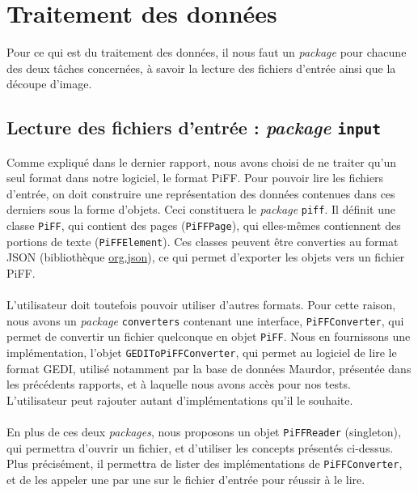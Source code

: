 \section{Traitement des données}

Pour ce qui est du traitement des données, il nous faut un \textit{package} pour chacune des deux tâches concernées, à savoir la lecture des fichiers d'entrée ainsi que la découpe d'image.

\subsection{Lecture des fichiers d'entrée : \textit{package} \texttt{input}}

Comme expliqué dans le dernier rapport, nous avons choisi de ne traiter qu'un seul format dans notre logiciel, le format PiFF. Pour pouvoir lire les fichiers d'entrée, on doit construire une représentation des données contenues dans ces derniers sous la forme d'objets. Ceci constituera le \textit{package} \texttt{piff}. Il définit une classe \texttt{PiFF}, qui contient des pages (\texttt{PiFFPage}), qui elles-mêmes contiennent des portions de texte (\texttt{PiFFElement}). Ces classes peuvent être converties au format JSON (bibliothèque \href{https://mvnrepository.com/artifact/org.json/json}{org.json}), ce qui permet d'exporter les objets vers un fichier PiFF.

\paragraph{}
L'utilisateur doit toutefois pouvoir utiliser d'autres formats. Pour cette raison, nous avons un \textit{package} \texttt{converters} contenant une interface, \texttt{PiFFConverter}, qui permet de convertir un fichier quelconque en objet \texttt{PiFF}. Nous en fournissons une implémentation, l'objet \texttt{GEDIToPiFFConverter}, qui permet au logiciel de lire le format GEDI, utilisé notamment par la base de données Maurdor, présentée dans les précédents rapports, et à laquelle nous avons accès pour nos tests. L'utilisateur peut rajouter autant d'implémentations qu'il le souhaite.

\paragraph{}
En plus de ces deux \textit{packages}, nous proposons un objet \texttt{PiFFReader} (singleton), qui permettra d'ouvrir un fichier, et d'utiliser les concepts présentés ci-dessus. Plus précisément, il permettra de lister des implémentations de \texttt{PiFFConverter}, et de les appeler une par une sur le fichier d'entrée pour réussir à le lire.


